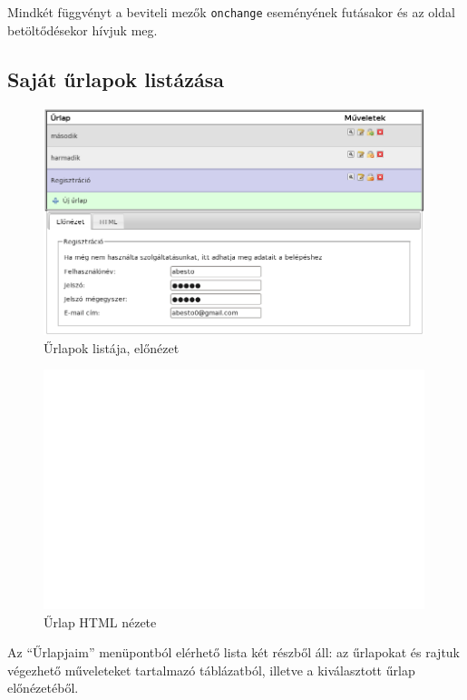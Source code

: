 \documentclass[12pt,a4paper,twoside]{article}
\begin{document}
Mindkét függvényt a beviteli mezők \texttt{onchange} eseményének futásakor és az
oldal betöltődésekor hívjuk meg.


\clearpage
{}
\subsection{Saját űrlapok listázása}

\centering
\begin{figure}[H]
  \includegraphics[width=420px]{form_list.png}
  \caption{Űrlapok listája, előnézet}
\end{figure}
\begin{figure}[H]
  \includegraphics[width=420px]{form_list_html.png}
  \caption{Űrlap HTML nézete}
\end{figure}

Az ``Űrlapjaim'' menüpontból elérhető lista két részből áll: az űrlapokat  és
rajtuk végezhető műveleteket tartalmazó táblázatból, illetve a kiválasztott
űrlap előnézetéből.
\end{document}
